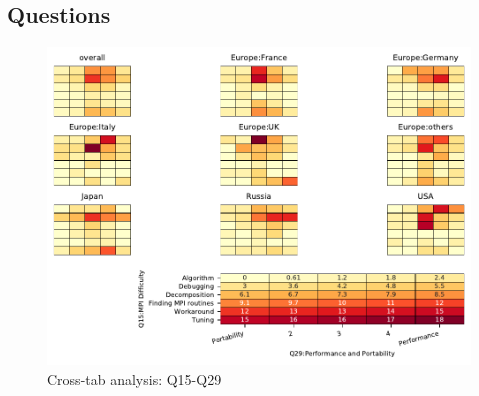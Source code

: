 
\subsection{Questions}


\begin{figure}
\begin{center}
\includegraphics[width=12cm]{../pdfs/Q15-Q29.pdf}
\caption{Cross-tab analysis: Q15-Q29}
\label{fig:Q15-Q29}
\end{center}
\end{figure}
